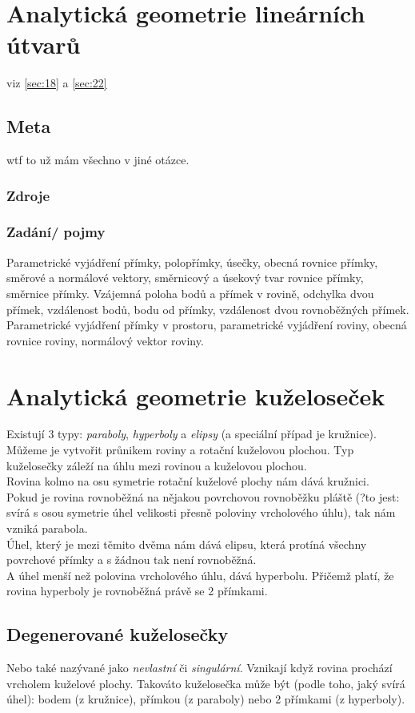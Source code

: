 \documentclass[12pt]{article}
\begin{document}
\section{Analytická geometrie lineárních útvarů}
viz \ref{sec:18} a \ref{sec:22}
\subsection{Meta}
wtf to už mám všechno v jiné otázce. 
\subsubsection{Zdroje}
\subsubsection{Zadání/ pojmy}
Parametrické vyjádření přímky, polopřímky, úsečky, obecná rovnice přímky, směrové a normálové vektory, směrnicový a úsekový tvar rovnice přímky, směrnice přímky. Vzájemná poloha bodů a přímek v rovině, odchylka dvou přímek, vzdálenost bodů, bodu od přímky, vzdálenost dvou rovnoběžných přímek. Parametrické vyjádření přímky v prostoru, parametrické vyjádření roviny, obecná rovnice roviny, normálový vektor roviny.

\section{Analytická geometrie kuželoseček}
\label{sec:kuzelosecky}
Existují 3 typy: \emph{paraboly}, \emph{hyperboly} a \emph{elipsy} (a speciální případ je kružnice). Můžeme je vytvořit průnikem roviny a rotační kuželovou plochou. Typ kuželosečky záleží na úhlu mezi rovinou a kuželovou plochou.\\
Rovina kolmo na osu symetrie rotační kuželové plochy nám dává kružnici.\\Pokud je rovina rovnoběžná na nějakou povrchovou rovnoběžku pláště (?to jest: svírá s osou symetrie úhel velikosti přesně poloviny vrcholového úhlu), tak nám vzniká parabola.\\
Úhel, který je mezi těmito dvěma nám dává elipsu, která protíná všechny povrchové přímky a s žádnou tak není rovnoběžná.\\
A úhel menší než polovina vrcholového úhlu, dává hyperbolu. Přičemž platí, že rovina hyperboly je rovnoběžná právě se 2 přímkami.
\subsection{Degenerované kuželosečky}
Nebo také nazývané jako \emph{nevlastní} či \emph{singulární}. Vznikají když rovina prochází vrcholem kuželové plochy. Takováto kuželosečka může být  (podle toho, jaký svírá úhel): bodem (z kružnice), přímkou (z paraboly) nebo 2 přímkami (z hyperboly).
\end{document}
